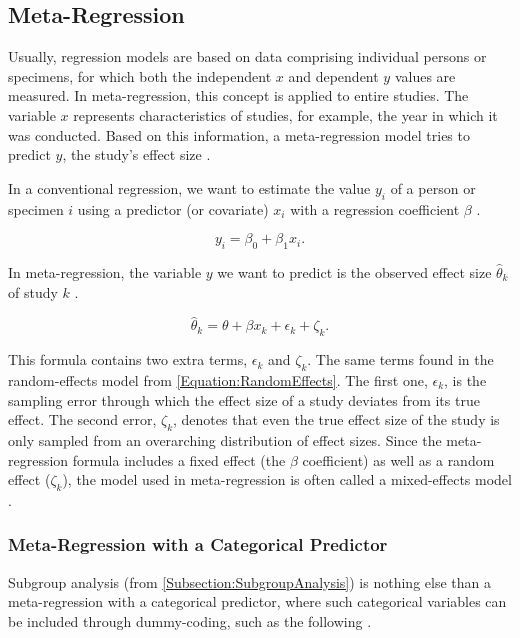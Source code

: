 \documentclass[../../../main.tex]{subfiles}
\begin{document}
\subsection{Meta-Regression}

Usually, regression models are based on data comprising individual persons or specimens, for which both the independent $x$ and dependent $y$ values are measured. In meta-regression, this concept is applied to entire studies. The variable $x$ represents characteristics of studies, for example, the year in which it was conducted. Based on this information, a meta-regression model tries to predict $y$, the study's effect size \autocite{Harrer2021}.

In a conventional regression, we want to estimate the value $y_i$ of a person or specimen $i$ using a predictor (or covariate) $x_i$ with a regression coefficient $\beta$ \autocite{Harrer2021}.

\begin{equation}
y_i = \beta_0 + \beta_1 x_i.
\end{equation}

In meta-regression, the variable $y$ we want to predict is the observed effect size $\hat{\theta}_k$ of study $k$ \autocite{Harrer2021}.

\begin{equation}
\hat{\theta}_k = \theta + \beta x_k + \epsilon_k + \zeta_k.
\label{Equation:MetaRegression}
\end{equation}

This formula contains two extra terms, $\epsilon_k$ and $\zeta_k$. The same terms found in the random-effects model from \autoref{Equation:RandomEffects}. The first one, $\epsilon_k$, is the sampling error through which the effect size of a study deviates from its true effect. The second error, $\zeta_k$, denotes that even the true effect size of the study is only sampled from an overarching distribution of effect sizes. Since the meta-regression formula includes a fixed effect (the $\beta$ coefficient) as well as a random effect ($\zeta_k$), the model used in meta-regression is often called a mixed-effects model \autocite{Harrer2021}.

\subsubsection{Meta-Regression with a Categorical Predictor}

Subgroup analysis (from \autoref{Subsection:SubgroupAnalysis}) is nothing else than a meta-regression with a categorical predictor, where such categorical variables can be included through dummy-coding, such as the following \autocite{Harrer2021}.
\end{document}
